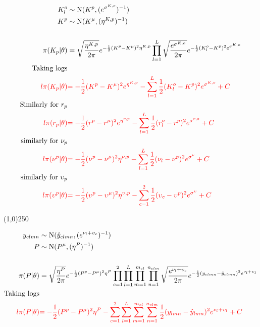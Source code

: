 \begin{align*}
K_{l}^o &\sim \operatorname{N}(K^p, (e^{ \sigma^{K,o} })^{-1} )\\
K^p &\sim \operatorname{N}(K^\mu, ({\eta^{K,p}})^{-1} )\\
\\
\pi(K_p|\theta)&=
\sqrt{\frac{\eta^{K,p}}{2\pi}} e^{-\frac{1}{2}(K^p-K^\mu)^{2}\eta^{K,p} }
\prod_{l=1}^{L}\sqrt{\frac{e^{ \sigma^{K,o} }}{2\pi}} e^{-\frac{1}{2}(K_{l}^o-K^p)^{2}e^{ \sigma^{K,o} } }\\
\text{Taking logs}\\
\color{red}{l\pi(K_p|\theta)}&
\color{red}{
=-\frac{1}{2}(K^p-K^\mu)^{2}e^{\eta^{K,p}}
-
\sum_{l=1}^{L}\frac{1}{2}(K_{l}^o-K^p)^{2}e^{ \sigma^{K,o} }
+C
}\\
\text{Similarly for $r_p$}\\
\color{red}{l\pi(r_p|\theta)}&
\color{red}{
=-\frac{1}{2}(r^p-r^\mu)^{2}e^{\eta^{r,p}}
-
\sum_{l=1}^{L}\frac{1}{2}(r_{l}^o-r^p)^{2}e^{ \sigma^{r,o} }
+C}\\ 
\text{similarly for $\nu_p$}\\
\color{red}{l\pi(\nu^p|\theta)}&
\color{red}{
=-\frac{1}{2}(\nu^p-\nu^\mu)^{2}\eta^{\nu,p}
-
\sum_{l=1}^{L}
\frac{1}{2}(\nu_{l}-\nu^p)^{2}e^{ {\sigma}^{\nu} } 
+C}\\
\text{similarly for $\upsilon_p$}\\
\color{red}{l\pi(\upsilon^p|\theta)}&
\color{red}{
=-\frac{1}{2}(\upsilon^p-\upsilon^\mu)^{2}\eta^{\upsilon,p}
-
\sum_{c=1}^{2}
\frac{1}{2}(\upsilon_{c}-\upsilon^p)^{2}e^{ {\sigma}^{\upsilon} } 
+C}
\end{align*}


\begin{center}
\line(1,0){250}
\end{center}

\begin{align*}
y_{clmn} &\sim \operatorname{N}(\hat{y}_{clmn},(e^{ \nu_{l}+\upsilon_{c}})^{-1} ) \\
P &\sim \operatorname{N}(P^\mu, ({\eta^{P}})^{-1} )\\
\\
\pi(P|\theta)&=
\sqrt{\frac{\eta^{P}}{2\pi}} e^{-\frac{1}{2}(P^p-P^\mu)^{2}\eta^{P} }
\prod_{c=1}^{2}\prod_{l=1}^{L}\prod_{m=1}^{m_{cl}}\prod_{n=1}^{n_{clm}}
\sqrt{\frac{e^{ \nu_{l}+\upsilon_{c}}}{2\pi}} e^{-\frac{1}{2}(y_{clmn}-\hat{y}_{clmn})^{2}e^{ \nu_{l}+\upsilon_{l}} }\\
\text{Taking logs}\\
\color{red}{l\pi(P|\theta)}&
\color{red}{
=-\frac{1}{2}(P^p-P^\mu)^{2}\eta^{P}
-
\sum_{c=1}^{2}\sum_{l=1}^{L}\sum_{m=1}^{m_{cl}}\sum_{n=1}^{n_{clm}}
\frac{1}{2}(y_{lmn}-\hat{y}_{lmn})^{2}e^{\nu_{l}+\upsilon_{l}}
+C}\end{align*}
